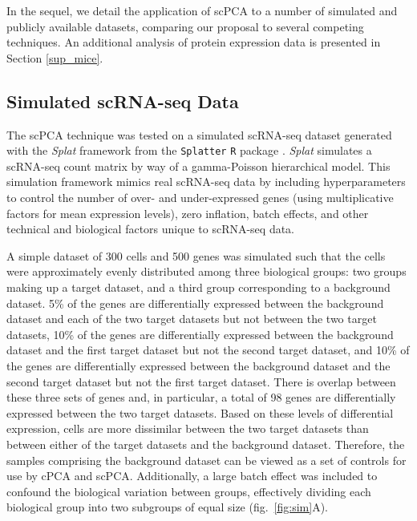 In the sequel, we detail the application of scPCA to a number of simulated and publicly available datasets, comparing our proposal to several competing techniques. An additional analysis of protein expression data is presented in Section \ref{sup_mice}.

\subsection{Simulated scRNA-seq Data}\label{sim_scRNA-seq}

The scPCA technique was tested on a simulated scRNA-seq dataset generated with the \textit{Splat} framework from the \texttt{Splatter} \texttt{R} package  \cite{Zappia2017}. \textit{Splat} simulates a scRNA-seq count matrix by way of a gamma-Poisson hierarchical model. 
This simulation framework mimics real scRNA-seq data by including hyperparameters to control the number of over- and under-expressed genes (using multiplicative factors for mean expression levels), zero inflation, batch effects, and other technical and biological factors unique to scRNA-seq data.

A simple dataset of 300 cells and 500 genes was simulated such that the cells were approximately evenly distributed among three biological groups: two groups making up a target dataset, and a third group corresponding to a background dataset. 5\% of the genes are differentially expressed between the background dataset and each of the two target datasets but not between the two target datasets, 10\% of the genes are differentially expressed between the background dataset and the first target dataset but not the second target dataset, and 10\% of the genes are differentially expressed between the background dataset and the second target dataset but not the first target dataset. There is overlap between these three sets of genes and, in particular, a total of 98 genes are differentially expressed between the two target datasets. Based on these levels of differential expression, cells are more dissimilar between the two target datasets than between either of the target datasets and the background dataset. Therefore, the samples comprising the background dataset can be viewed as a set of controls for use by cPCA and scPCA. Additionally, a large batch effect was included to confound the biological variation between groups, effectively dividing each biological group into two subgroups of equal size (fig.~\ref{fig:sim}A).

